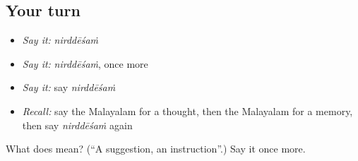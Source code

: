 \subsection*{Your turn}
\begin{itemize}
\raggedright
  \item \emph{Say it:} \emph{nirddēśaṁ}
  \item \emph{Say it:} \emph{nirddēśaṁ}, once more
  \item \emph{Say it:} say \emph{nirddēśaṁ}
  \item \emph{Recall:} say the Malayalam for a thought, then the Malayalam for a memory, then say \emph{nirddēśaṁ} again
\end{itemize}

\begin{tcolorbox}[breakable,colback=teal!4,colframe=teal!35!black,title={Before you move on}]
What does  mean? (\textquotedblleft{}A suggestion, an instruction\textquotedblright{}.) Say it once more.
\end{tcolorbox}
